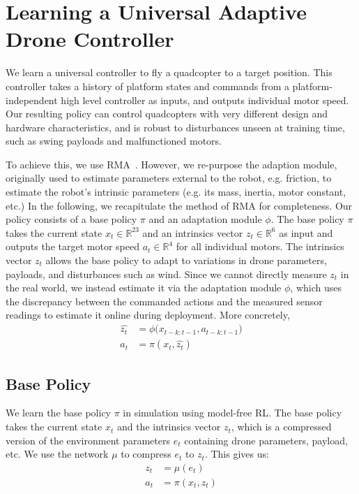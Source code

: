 \section{Learning a Universal Adaptive Drone Controller}
\label{sec:method}



We learn a universal controller to fly a quadcopter to a target position. This controller takes a history of platform states and commands from a platform-independent high level controller as inputs, and outputs individual motor speed. Our resulting policy can control quadcopters with very different design and hardware characteristics, and is robust to disturbances unseen at training time, such as swing payloads and malfunctioned motors.

 To achieve this, we use RMA~\cite{kumar2021rma}. However, we re-purpose the adaption module, originally used to estimate parameters external to the robot, e.g. friction, to estimate the robot's intrinsic parameters (e.g. its mass, inertia, motor constant, etc.) In the following, we recapitulate the method of RMA for completeness. Our policy consists of a base policy $\pi$ and an adaptation module $\phi$. The base policy $\pi$ takes the current state $x_t \in \mathbb{R}^{23}$ and an intrinsics vector $z_t \in \mathbb{R}^6$
 as input and outputs the target motor speed $a_t \in \mathbb{R}^4$ for all individual motors. The intrinsics vector $z_t$ allows the base policy to adapt to variations in drone parameters, payloads, and disturbances such as wind. Since we cannot directly measure $z_t$ in the real world, we instead estimate it via the adaptation module $\phi$, which uses the discrepancy between the commanded actions and the measured sensor readings to estimate it online during deployment. More concretely, 
\begin{align}
    \hat{z_t} &=  \phi\big(x_{t-k:t-1}, a_{t-k:t-1}\big) \\
    a_t &= \pi(x_t, \hat{z_t}) \label{eq:pi}
\end{align}

\subsection{Base Policy}
We learn the base policy $\pi$ in simulation using model-free RL. The base policy takes the current state $x_t$ and the intrinsics vector $z_t$, which is a compressed version of the environment parameters $e_t$ containing drone parameters, payload, etc. We use the network $\mu$ to compress $e_t$ to $z_t$. This gives us:
\begin{align}
        z_t &= \mu(e_t) \\  
        a_t &= \pi(x_t, z_t)
\end{align}

